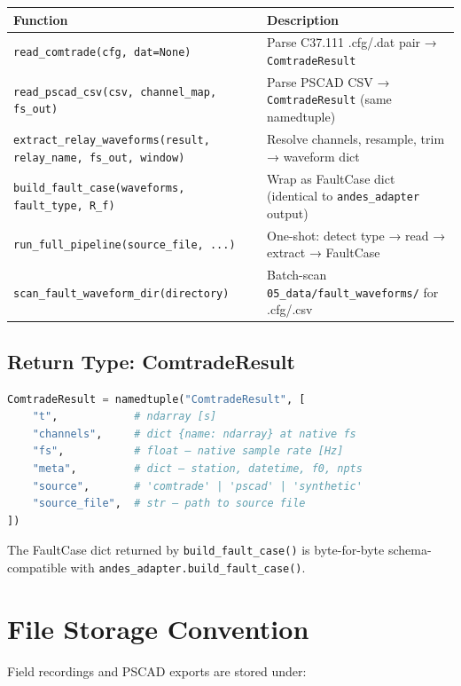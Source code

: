 \documentclass[11pt,a4paper]{article}
\begin{document}
\begin{center}
\begin{tabular}{p{5.5cm}p{8cm}}
\toprule
Function & Description \\
\midrule
\texttt{read\_comtrade(cfg, dat=None)} &
  Parse C37.111 .cfg/.dat pair → \texttt{ComtradeResult} \\
\texttt{read\_pscad\_csv(csv, channel\_map, fs\_out)} &
  Parse PSCAD CSV → \texttt{ComtradeResult} (same namedtuple) \\
\texttt{extract\_relay\_waveforms(result, relay\_name, fs\_out, window)} &
  Resolve channels, resample, trim → waveform dict \\
\texttt{build\_fault\_case(waveforms, fault\_type, R\_f)} &
  Wrap as FaultCase dict (identical to \texttt{andes\_adapter} output) \\
\texttt{run\_full\_pipeline(source\_file, ...)} &
  One-shot: detect type → read → extract → FaultCase \\
\texttt{scan\_fault\_waveform\_dir(directory)} &
  Batch-scan \texttt{05\_data/fault\_waveforms/} for .cfg/.csv \\
\bottomrule
\end{tabular}
\end{center}

\subsection{Return Type: ComtradeResult}

\begin{lstlisting}[language=Python]
ComtradeResult = namedtuple("ComtradeResult", [
    "t",            # ndarray [s]
    "channels",     # dict {name: ndarray} at native fs
    "fs",           # float — native sample rate [Hz]
    "meta",         # dict — station, datetime, f0, npts
    "source",       # 'comtrade' | 'pscad' | 'synthetic'
    "source_file",  # str — path to source file
])
\end{lstlisting}

The FaultCase dict returned by \texttt{build\_fault\_case()} is byte-for-byte
schema-compatible with \texttt{andes\_adapter.build\_fault\_case()}.

\section{File Storage Convention}
\label{sec:storage}

Field recordings and PSCAD exports are stored under:
\end{document}
